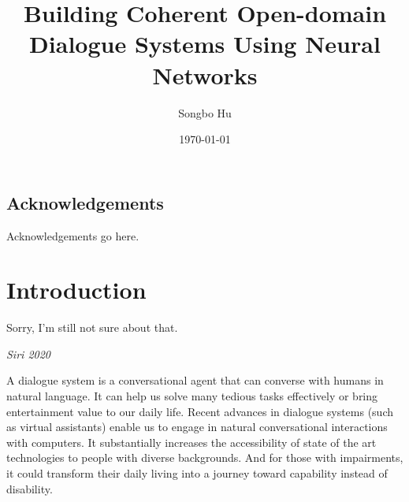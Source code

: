 \documentclass[bsc,frontabs,twoside,singlespacing,parskip,deptreport]{infthesis}     %
\begin{document}
\title{Building Coherent Open-domain Dialogue Systems Using Neural Networks}

\author{Songbo Hu}



\date{\today}


\maketitle

\section*{Acknowledgements}
Acknowledgements go here. 

\tableofcontents



\chapter{Introduction}

\epigraph{Sorry, I'm still not sure about that.}{\textit{Siri 2020}}

A dialogue system is a conversational agent that can converse with humans in natural language. It can help us solve many tedious tasks effectively or bring entertainment value to our daily life. Recent advances in dialogue systems (such as virtual assistants) enable us to engage in natural conversational interactions with computers. It substantially increases the accessibility of state of the art technologies to people with diverse backgrounds. And for those with impairments, it could transform their daily living into a journey toward capability instead of disability.
\end{document}
